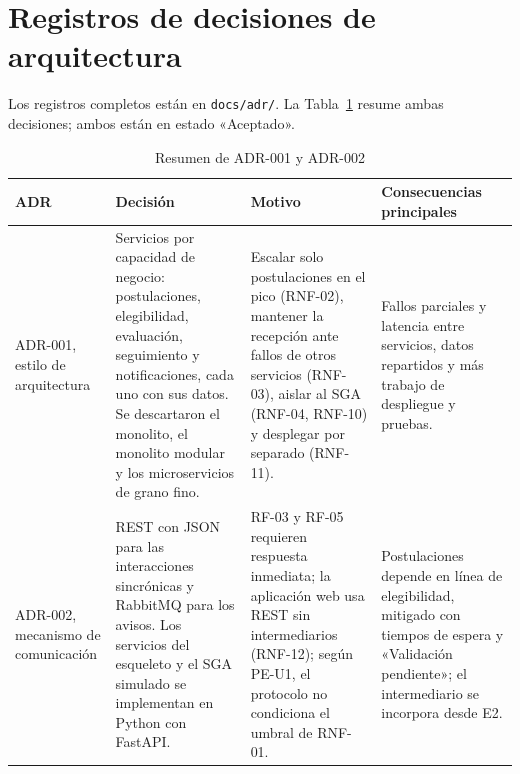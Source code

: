 \section{Registros de decisiones de arquitectura}
\label{sec:resumen-adr}

Los registros completos están en \texttt{docs/adr/}. La Tabla~\ref{tab:adr} resume ambas decisiones; ambos están en estado «Aceptado».

\begin{table}[htbp]
  \centering
  \caption{Resumen de ADR-001 y ADR-002}
  \label{tab:adr}
  \small
  \begin{tabularx}{\textwidth}{@{}>{\raggedright\arraybackslash}p{1.7cm}
                                  >{\raggedright\arraybackslash}X
                                  >{\raggedright\arraybackslash}X
                                  >{\raggedright\arraybackslash}X@{}}
    \toprule
    \textbf{ADR} & \textbf{Decisión} & \textbf{Motivo} & \textbf{Consecuencias principales} \\
    \midrule
    ADR-001, estilo de arquitectura
      & Servicios por capacidad de negocio: postulaciones, elegibilidad, evaluación, seguimiento y notificaciones, cada uno con sus datos. Se descartaron el monolito, el monolito modular y los microservicios de grano fino.
      & Escalar solo postulaciones en el pico (RNF-02), mantener la recepción ante fallos de otros servicios (RNF-03), aislar al SGA (RNF-04, RNF-10) y desplegar por separado (RNF-11).
      & Fallos parciales y latencia entre servicios, datos repartidos y más trabajo de despliegue y pruebas. \\
    \addlinespace
    ADR-002, mecanismo de comunicación
      & REST con JSON para las interacciones sincrónicas y RabbitMQ para los avisos. Los servicios del esqueleto y el SGA simulado se implementan en Python con FastAPI.
      & RF-03 y RF-05 requieren respuesta inmediata; la aplicación web usa REST sin intermediarios (RNF-12); según PE-U1, el protocolo no condiciona el umbral de RNF-01.
      & Postulaciones depende en línea de elegibilidad, mitigado con tiempos de espera y «Validación pendiente»; el intermediario se incorpora desde E2. \\
    \bottomrule
  \end{tabularx}
\end{table}
